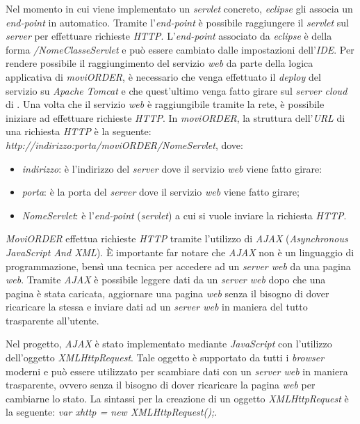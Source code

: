 Nel momento in cui viene implementato un \textit{servlet} concreto, \textit{eclipse} gli associa un \textit{end-point} in automatico. Tramite l'\textit{end-point} è possibile raggiungere il \textit{servlet} sul \textit{server} per effettuare richieste \textit{HTTP}. L'\textit{end-point} associato da \textit{eclipse} è della forma \textit{/NomeClasseServlet} e può essere cambiato dalle impostazioni dell'\textit{IDE}. Per rendere possibile il raggiungimento del servizio \textit{web} da parte della logica applicativa di \textit{moviORDER}, è necessario che venga effettuato il \textit{deploy} del servizio su \textit{Apache Tomcat} e che quest'ultimo venga fatto girare sul \textit{server cloud} di \visione{}. Una volta che il servizio \textit{web} è raggiungibile tramite la rete, è possibile iniziare ad effettuare richieste \textit{HTTP}. In \textit{moviORDER}, la struttura dell'\textit{URL} di una richiesta \textit{HTTP} è la seguente: \textit{http://indirizzo:porta/moviORDER/NomeServlet}, dove:
\begin{itemize}
	\item \textit{indirizzo}: è l'indirizzo del \textit{server} dove il servizio \textit{web} viene fatto girare:
	\item \textit{porta}: è la porta del \textit{server} dove il servizio \textit{web} viene fatto girare;
	\item \textit{NomeServlet}: è l'\textit{end-point} (\textit{servlet}) a cui si vuole inviare la richiesta \textit{HTTP}.
\end{itemize}

\textit{MoviORDER} effettua richieste \textit{HTTP} tramite l'utilizzo di \textit{AJAX} (\textit{Asynchronous JavaScript And XML}). È importante far notare che \textit{AJAX} non è un linguaggio di programmazione, bensì una tecnica per accedere ad un \textit{server web} da una pagina \textit{web}. Tramite \textit{AJAX} è possibile leggere dati da un \textit{server web} dopo che una pagina è stata caricata, aggiornare una pagina \textit{web} senza il bisogno di dover ricaricare la stessa e inviare dati ad un \textit{server web} in maniera del tutto trasparente all'utente. 

Nel progetto, \textit{AJAX} è stato implementato mediante \textit{JavaScript} con l'utilizzo dell'oggetto \textit{XMLHttpRequest}. Tale oggetto è supportato da tutti i \textit{browser} moderni e può essere utilizzato per scambiare dati con un \textit{server web} in maniera trasparente, ovvero senza il bisogno di dover ricaricare la pagina \textit{web} per cambiarne lo stato. La sintassi per la creazione di un oggetto \textit{XMLHttpRequest} è la seguente:
\textit{var xhttp = new XMLHttpRequest();}. 


